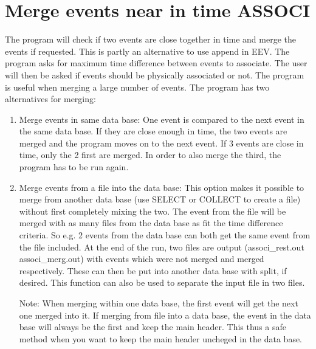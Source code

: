 
\section{Merge events near in time ASSOCI}

 

The program will check if two events are close together in time and merge the events if requested. This is partly an alternative to use append in EEV. The program asks for maximum time difference between events to associate. The user will then be asked if events should be physically associated or not. The program is useful when merging a large number of events. The program has two alternatives for merging: 

\begin{enumerate}
\item
Merge events in same data base: One event is compared to the next event in the same data base. If they are close enough in time, the two events are merged and the program moves on to the next event. If 3 events are close in time, only the 2 first are merged. In order to also merge the third, the program has to be run again. 
\item
Merge events from a file into the data base: This option makes it possible to merge from another data base (use SELECT or COLLECT to create a file) without first completely mixing the two. The event from the file will be merged with as many files from the data base as fit the time difference criteria. So e.g. 2 events from the data base can both get the same event from the file included. At the end of the run, two files are output (associ\_rest.out associ\_merg.out) with events which were not merged and merged respectively. These can then be put into another data base with split, if desired. This function can also be used to separate the input file in two files.

Note: When merging within one data base, the first event will get the next one merged into it. If merging from file into a data base, the event in the data base will always be the first and keep the main header. This thus a safe method when you want to keep the main header uncheged in the data base. 
\end{enumerate}

